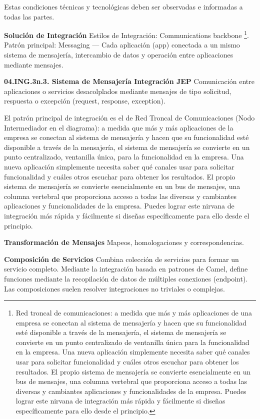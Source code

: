 \documentclass[
  paper=a4,
  ,captions=tableheading
]{scrartcl}
\begin{document}
Estas condiciones técnicas y tecnológicas deben ser observadas e
informadas a todas las partes.

\textbf{Solución de Integración} Estilos de Integración: Communications
backbone \footnote{Red troncal de comunicaciones: a medida que más y más
  aplicaciones de una empresa se conectan al sistema de mensajería y
  hacen que su funcionalidad esté disponible a través de la mensajería,
  el sistema de mensajería se convierte en un punto centralizado de
  ventanilla única para la funcionalidad en la empresa. Una nueva
  aplicación simplemente necesita saber qué canales usar para solicitar
  funcionalidad y cuáles otros escuchar para obtener los resultados. El
  propio sistema de mensajería se convierte esencialmente en un bus de
  mensajes, una columna vertebral que proporciona acceso a todas las
  diversas y cambiantes aplicaciones y funcionalidades de la empresa.
  Puedes lograr este nirvana de integración más rápida y fácilmente si
  diseñas específicamente para ello desde el principio.}. Patrón
principal: Messaging --- Cada aplicación (app) conectada a un mismo
sistema de mensajería, intercambio de datos y operación entre
aplicaciones mediante mensajes.

\textbf{04.ING.3n.3. Sistema de Mensajería Integración JEP} Comunicación
entre aplicaciones o servicios desacolplados mediante mensajes de tipo
solicitud, respuesta o excepción (request, response, exception).

El patrón principal de integración es el de Red Troncal de
Comunicaciones (Nodo Intermediador en el diagrama): a medida que más y
más aplicaciones de la empresa se conectan al sistema de mensajería y
hacen que su funcionalidad esté disponible a través de la mensajería, el
sistema de mensajería se convierte en un punto centralizado, ventanilla
única, para la funcionalidad en la empresa. Una nueva aplicación
simplemente necesita saber qué canales usar para solicitar funcionalidad
y cuáles otros escuchar para obtener los resultados. El propio sistema
de mensajería se convierte esencialmente en un bus de mensajes, una
columna vertebral que proporciona acceso a todas las diversas y
cambiantes aplicaciones y funcionalidades de la empresa. Puedes lograr
este nirvana de integración más rápida y fácilmente si diseñas
específicamente para ello desde el principio.

\textbf{Transformación de Mensajes} Mapeos, homologaciones y
correspondencias.

\textbf{Composición de Servicios} Combina colección de servicios para
formar un servicio completo. Mediante la integración basada en patrones
de Camel, define funciones mediante la recopilación de datos de
múltiples conexiones (endpoint). Las composiciones suelen resolver
integraciones no triviales o complejas.
\end{document}
